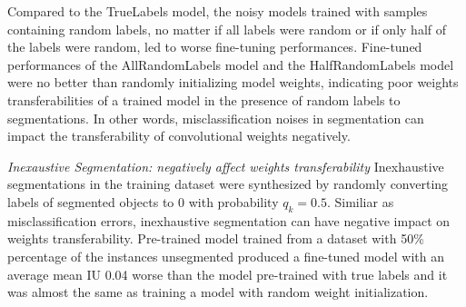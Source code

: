 \noindent
Compared to the TrueLabels model, the noisy models trained with samples containing random labels, no matter if all labels were random or if only half of the labels were random,  led to worse fine-tuning performances.
Fine-tuned performances of the AllRandomLabels model and the HalfRandomLabels model were no better than randomly initializing model weights, indicating poor weights transferabilities of a trained model in the presence of random labels to segmentations.
In other words, misclassification noises in segmentation can impact the transferability of convolutional weights negatively.

\noindent \textit{Inexaustive Segmentation: negatively affect weights transferability}
\noindent
Inexhaustive segmentations in the training dataset were synthesized by randomly converting labels of segmented objects to 0 with probability $q_{k}=0.5$.
Similiar as misclassification errors, inexhaustive segmentation can have negative impact on weights transferability.
Pre-trained model trained from a dataset with 50\% percentage of the instances unsegmented produced a fine-tuned model with an average mean IU 0.04 worse than the model pre-trained with true labels and it was almost the same as training a model with random weight initialization.



